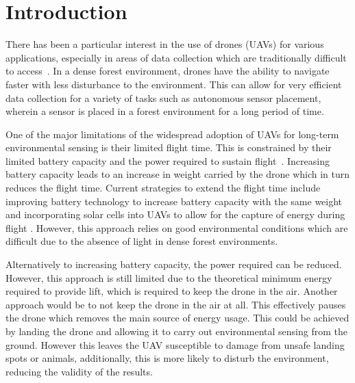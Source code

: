 \chapter{Introduction}
There has been a particular interest in the use of drones (UAVs) for various applications, especially in areas of data collection which are traditionally difficult to access~\cite{droneReview}.
In a dense forest environment, drones have the ability to navigate faster with less disturbance to the environment.
This can allow for very efficient data collection for a variety of tasks \cite{environmentalSensing} such as autonomous sensor placement, wherein a sensor is placed in a forest environment for a long period of time.

One of the major limitations of the widespread adoption of UAVs for long-term environmental sensing is their limited flight time.
This is constrained by their limited battery capacity and the power required to sustain flight~\cite{droneBattery}.
Increasing battery capacity leads to an increase in weight carried by the drone which in turn reduces the flight time.
Current strategies to extend the flight time include improving battery technology to increase battery capacity with the same weight and incorporating solar cells into UAVs to allow for the capture of energy during flight \cite{droneSunlight}.
However, this approach relies on good environmental conditions which are difficult due to the absence of light in dense forest environments.

Alternatively to increasing battery capacity, the power required can be reduced.
However, this approach is still limited due to the theoretical minimum energy required to provide lift, which is required to keep the drone in the air.
Another approach would be to not keep the drone in the air at all.
This effectively pauses the drone which removes the main source of energy usage.
This could be achieved by landing the drone and allowing it to carry out environmental sensing from the ground.
However this leaves the UAV susceptible to damage from unsafe landing spots or animals, additionally, this is more likely to disturb the environment, reducing the validity of the results.

